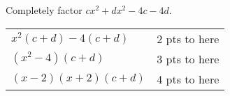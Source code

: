 

{
	Completely factor $cx^2+dx^2-4c-4d$.
}
{
	\begin{tabular}{l r}
	$x^2(c+d)-4(c+d)$ & 2 pts to here\\
	$(x^2-4)(c+d)$ & 3 pts to here\\
	$(x-2)(x+2)(c+d)$ & 4 pts to here
	\end{tabular}
}
